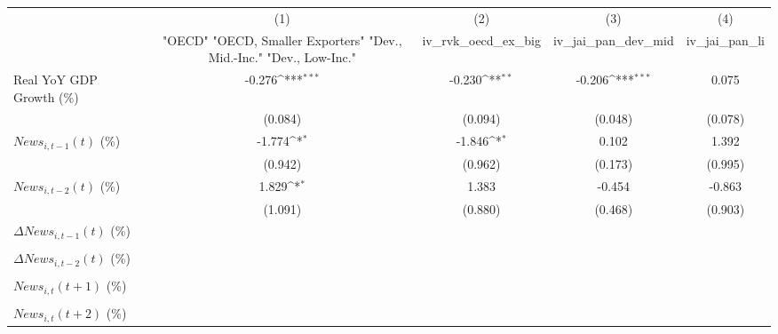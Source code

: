 {
\def\sym#1{\ifmmode^{#1}\else\(^{#1}\)\fi}
\begin{tabular}{l*{4}{c}}
\toprule
                    &\multicolumn{1}{c}{(1)}&\multicolumn{1}{c}{(2)}&\multicolumn{1}{c}{(3)}&\multicolumn{1}{c}{(4)}\\
                    &\multicolumn{1}{c}{ "OECD" "OECD, Smaller Exporters" "Dev., Mid.-Inc." "Dev., Low-Inc."}&\multicolumn{1}{c}{iv_rvk_oecd_ex_big}&\multicolumn{1}{c}{iv_jai_pan_dev_mid}&\multicolumn{1}{c}{iv_jai_pan_li}\\
\midrule
Real YoY GDP Growth (\%)&      -0.276\sym{***}&      -0.230\sym{**} &      -0.206\sym{***}&       0.075         \\
                    &     (0.084)         &     (0.094)         &     (0.048)         &     (0.078)         \\
\addlinespace
$ News_{i,t-1}(t)$ (\%)&      -1.774\sym{*}  &      -1.846\sym{*}  &       0.102         &       1.392         \\
                    &     (0.942)         &     (0.962)         &     (0.173)         &     (0.995)         \\
\addlinespace
$ News_{i,t-2}(t)$ (\%)&       1.829\sym{*}  &       1.383         &      -0.454         &      -0.863         \\
                    &     (1.091)         &     (0.880)         &     (0.468)         &     (0.903)         \\
\addlinespace
$ \Delta News_{i,t-1}(t)$ (\%)&                     &                     &                     &                     \\
                    &                     &                     &                     &                     \\
\addlinespace
$ \Delta News_{i,t-2}(t)$ (\%)&                     &                     &                     &                     \\
                    &                     &                     &                     &                     \\
\addlinespace
$ News_{i,t}(t+1)$ (\%)&                     &                     &                     &                     \\
                    &                     &                     &                     &                     \\
\addlinespace
$ News_{i,t}(t+2)$ (\%)&                     &                     &                     &                     \\

\end{tabular}}
